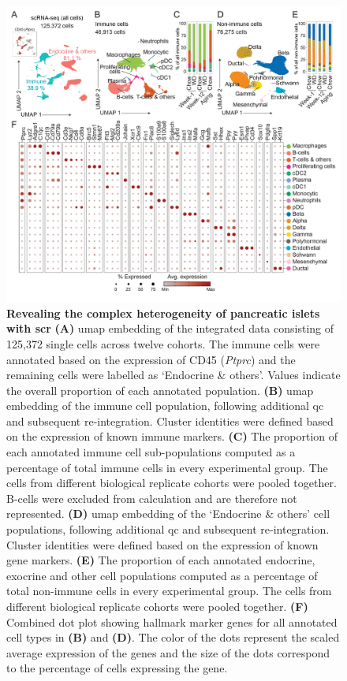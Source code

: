 \begin{figure}[H]
\centering
\includegraphics[width=\linewidth]{Chapter4/Fig/F2-3-01.png}
\caption[Revealing the complex heterogeneity of pancreatic islets with ]{\textbf{Revealing the complex heterogeneity of pancreatic islets with \gls{scr}} \textbf{(A)} \gls{umap} embedding of the integrated data consisting of 125,372 single cells across twelve cohorts. The immune cells were annotated based on the expression of CD45 (\textit{Ptprc}) and the remaining cells were labelled as `Endocrine \& others'. Values indicate the overall proportion of each annotated population. \textbf{(B)} \gls{umap} embedding of the immune cell population, following additional \gls{qc} and subsequent re-integration. Cluster identities were defined based on the expression of known immune markers. \textbf{(C)} The proportion of each annotated immune cell sub-populations computed as a percentage of total immune cells in every experimental group. The cells from different biological replicate cohorts were pooled together. B-cells were excluded from calculation and are therefore not represented. \textbf{(D)} \gls{umap} embedding of the `Endocrine \& others' cell populations, following additional \gls{qc} and subsequent re-integration. Cluster identities were defined based on the expression of known gene markers. \textbf{(E)} The proportion of each annotated endocrine, exocrine and other cell populations computed as a percentage of total non-immune cells in every experimental group. The cells from different biological replicate cohorts were pooled together. \textbf{(F)} Combined dot plot showing hallmark marker genes for all annotated cell types in \textbf{(B)} and \textbf{(D)}. The color of the dots represent the scaled average expression of the genes and the size of the dots correspond to the percentage of cells expressing the gene.}
\label{fig:chp2_fullscRNA}
\end{figure}

